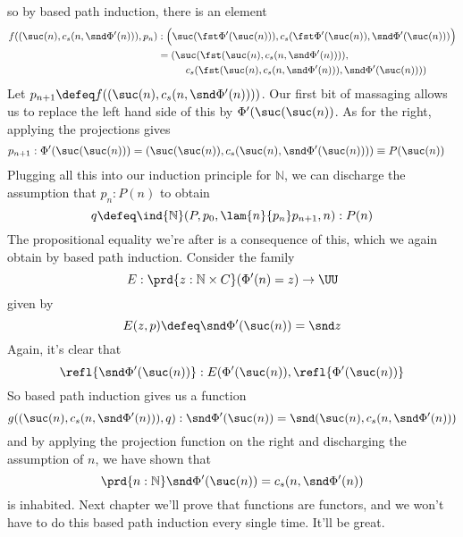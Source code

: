     so by based path induction, there is an element
    \begin{align*}
    f((\suc(n), c_{s}(n, \snd\Phi'(n))), p_{n}) &:
    \Big(\suc(\fst \Phi'(\suc(n))), c_{s}(\fst \Phi'(\suc(n)), \snd
    \Phi'(\suc(n)))\Big) 
    \\&=
    (\suc(\fst (\suc(n), c_{s}(n, \snd\Phi'(n)))),
    \\&\phantom{---}
    c_{s}(\fst (\suc(n), c_{s}(n,
    \snd\Phi'(n))), \snd\Phi'(\suc(n)))) 
    \end{align*}
    Let $p_{n+1} \defeq f((\suc(n), c_{s}(n, \snd \Phi'(n))))$.
    Our first bit of massaging allows us to replace the left hand side of this by
    $\Phi'(\suc(\suc(n))$.  As for the right, applying the projections gives
    \begin{align*}
    p_{n+1} &: \Phi'(\suc(\suc(n))) 
    =
    (\suc(\suc(n)), c_{s}(\suc(n), \snd\Phi'(\suc(n)))) 
    \equiv P(\suc(n))
    \end{align*}
    Plugging all this into our induction principle for $\mathbb{N}$, we can
    discharge the assumption that $p_{n} : P(n)$ to obtain
    \[
    q \defeq \ind{\mathbb{N}}(P, p_{0}, \lam{n}{p_{n}}p_{n+1}, n) : P(n)
    \]
    The propositional equality we're after is a consequence of this, which we again
    obtain by based path induction.  Consider the family
    \[
    E : \prd{z:\mathbb{N} \times C}(\Phi'(n) = z) \to \UU
    \]
    given by
    \[
    E(z, p) \defeq 
    \snd\Phi'(\suc(n)) = \snd z
    \]
    Again, it's clear that
    \[
    \refl{\snd\Phi'(\suc(n))} : E(\Phi'(\suc(n)), \refl{\Phi'(\suc(n))}
    \]
    So based path induction gives us a function
    \[
    g((\suc(n), c_{s}(n, \snd\Phi'(n))), q) : 
    \snd\Phi'(\suc(n)) = \snd (\suc(n), c_{s}(n, \snd\Phi'(n)))
    \]
    and by applying the projection function on the right and discharging the
    assumption of $n$, we have shown that
    \[
    \prd{n:\mathbb{N}}\snd\Phi'(\suc(n)) = c_{s}(n, \snd\Phi'(n))
    \]
    is inhabited.  Next chapter we'll prove that functions are functors, and we
    won't have to do this based path induction every single time.  It'll be great.
